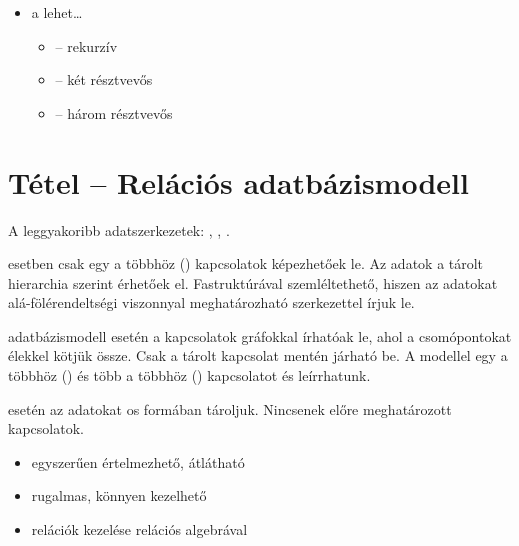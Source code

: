 \documentclass[main.tex]{subfiles}
\begin{document}
\begin{itemize}
    \item a  lehet\dots
    \begin{itemize}
      \item {} \tabto{2cm} – \tabto{2.5cm} rekurzív
      
      \item {} \tabto{2cm} – \tabto{2.5cm} két résztvevős

      \item {} \tabto{2cm} – \tabto{2.5cm} három résztvevős
    \end{itemize}
  \end{itemize}

  



  \section{Tétel – Relációs adatbázismodell} %

  A leggyakoribb adatszerkezetek:
  ,
  ,
  .

  \vspace{.5em}
   esetben csak egy a többhöz
  () kapcsolatok képezhetőek le.
  Az adatok a tárolt hierarchia szerint érhetőek el.
  Fastruktúrával szemléltethető,
  hiszen az adatokat alá-fölérendeltségi
  viszonnyal meghatározható szerkezettel írjuk le.

  \vspace{.5em}
   adatbázismodell esetén a kapcsolatok
  gráfokkal írhatóak le, ahol a csomópontokat élekkel
  kötjük össze. Csak a tárolt kapcsolat mentén járható be.
  A modellel egy a többhöz () és több a többhöz 
  () kapcsolatot és leírrhatunk.

  
   esetén az adatokat os
  formában tároljuk. Nincsenek előre meghatározott kapcsolatok.
  \begin{itemize}
    \item egyszerűen értelmezhető, átlátható
    
    \item rugalmas, könnyen kezelhető
    
    \item relációk kezelése relációs algebrával
  \end{itemize}
  
\end{document}
